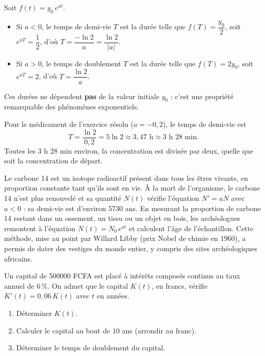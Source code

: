 \documentclass[11pt]{article}
\newcommand{\cle}[1]{{\popxbold\color{popdark}#1}}
\begin{document}
\begin{definition}
Soit $f(t) = y_0\,e^{at}$.
\begin{itemize}
\item Si $a < 0$, le \cle{temps de demi-vie} $T$ est la durée telle que $f(T) = \dfrac{y_0}{2}$, soit $e^{aT} = \dfrac{1}{2}$, d'où $T = \dfrac{-\ln 2}{a} = \dfrac{\ln 2}{|a|}$.
\item Si $a > 0$, le \cle{temps de doublement} $T$ est la durée telle que $f(T) = 2y_0$, soit $e^{aT} = 2$, d'où $T = \dfrac{\ln 2}{a}$.
\end{itemize}
Ces durées ne dépendent \textbf{pas} de la valeur initiale $y_0$ : c'est une propriété remarquable des phénomènes exponentiels.
\end{definition}

\begin{exemplebox}
Pour le médicament de l'exercice résolu ($a = -0{,}2$), le temps de demi-vie est
\[ T = \frac{\ln 2}{0{,}2} = 5\ln 2 \approx 3{,}47 \text{ h} \approx 3 \text{ h } 28 \text{ min}. \]
Toutes les $3$ h $28$ min environ, la concentration est divisée par deux, quelle que soit la concentration de départ.
\end{exemplebox}

\begin{savaistu}
Le carbone 14 est un isotope radioactif présent dans tous les êtres vivants, en proportion constante tant qu'ils sont en vie. À la mort de l'organisme, le carbone 14 n'est plus renouvelé et sa quantité $N(t)$ vérifie l'équation $N' = aN$ avec $a < 0$ : sa demi-vie est d'environ \num{5730} ans. En mesurant la proportion de carbone 14 restant dans un ossement, un tissu ou un objet en bois, les archéologues remontent à l'équation $N(t) = N_0\,e^{at}$ et calculent l'âge de l'échantillon. Cette méthode, mise au point par Willard Libby (prix Nobel de chimie en 1960), a permis de dater des vestiges du monde entier, y compris des sites archéologiques africains.
\end{savaistu}

\begin{exercice}
Un capital de \num{500000} FCFA est placé à intérêts composés continus au taux annuel de $6\,\%$. On admet que le capital $K(t)$, en francs, vérifie $K'(t) = 0{,}06\,K(t)$ avec $t$ en années.
\begin{enumerate}
\item Déterminer $K(t)$.
\item Calculer le capital au bout de $10$ ans (arrondir au franc).
\item Déterminer le temps de doublement du capital.
\end{enumerate}
\end{exercice}
\end{document}
